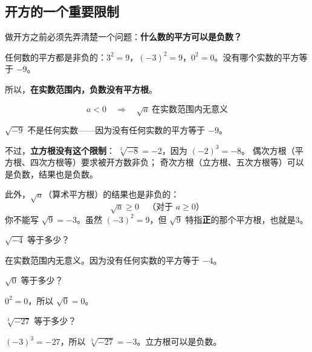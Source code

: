 \subsection*{开方的一个重要限制}

做开方之前必须先弄清楚一个问题：\textbf{什么数的平方可以是负数？}

任何数的平方都是非负的：$3^2=9$，$(-3)^2=9$，$0^2=0$。没有哪个实数的平方等于 $-9$。

所以，\textbf{在实数范围内，负数没有平方根}。

\[
a < 0 \quad\Longrightarrow\quad \sqrt{a}\ \text{在实数范围内无意义}
\]

$\sqrt{-9}$ 不是任何实数——因为没有任何实数的平方等于 $-9$。

不过，\textbf{立方根没有这个限制}：
$\sqrt[3]{-8} = -2$，因为 $(-2)^3 = -8$。
偶次方根（平方根、四次方根等）要求被开方数非负；
奇次方根（立方根、五次方根等）可以是负数，结果也是负数。

此外，$\sqrt{a}$（算术平方根）的结果也是非负的：
\[
\sqrt{a} \ge 0 \quad\text{（对于 $a\ge 0$）}
\]
你不能写 $\sqrt{9} = -3$。虽然 $(-3)^2=9$，但 $\sqrt{9}$ 特指\textbf{正}的那个平方根，也就是3。

\begin{example}
$\sqrt{-4}$ 等于多少？
\end{example}
\begin{solution}
在实数范围内无意义。因为没有任何实数的平方等于 $-4$。
\end{solution}

\begin{example}
$\sqrt{0}$ 等于多少？
\end{example}
\begin{solution}
$0^2=0$，所以 $\sqrt{0}=0$。
\end{solution}

\begin{example}
$\sqrt[3]{-27}$ 等于多少？
\end{example}
\begin{solution}
$(-3)^3=-27$，所以 $\sqrt[3]{-27}=-3$。立方根可以是负数。
\end{solution}

